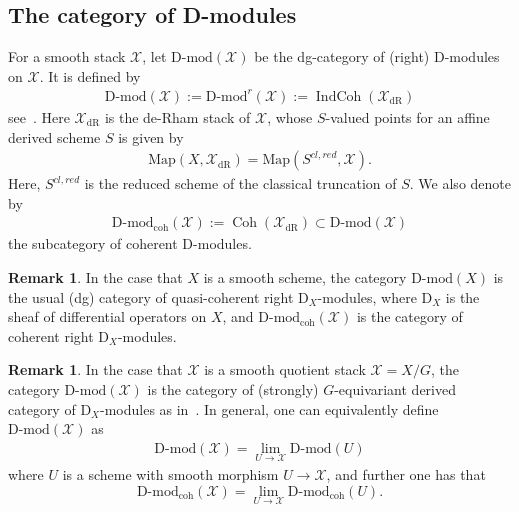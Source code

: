 \documentclass [11pt,oneside,a4paper,mathscr]{amsart}
\theoremstyle{definition}
\newtheorem{remark}[thm]{Remark}
\newcommand{\X}{\mathcal{X}}
\newcommand{\Coh}{\operatorname{Coh}}
\newcommand{\IndCoh}{\operatorname{IndCoh}}
\begin{document}
\subsection{The category of D-modules}\label{subsec:catD}
For a smooth stack $\mathcal{X}$, let $\text{D-mod}(\mathcal{X})$
be the dg-category of (right) D-modules on $\mathcal{X}$. 
It is defined by 
\begin{align*}
\text{D-mod}(\mathcal{X}):=
\text{D-mod}^r(\mathcal{X}):=\IndCoh(\mathcal{X}_{\mathrm{dR}})
\end{align*}
see~\cite{MR3701353}. 
Here $\mathcal{X}_{\mathrm{dR}}$ is the de-Rham stack of $\mathcal{X}$,
whose $S$-valued points for an affine derived scheme $S$ is 
given by 
\begin{align*}
\mathrm{Map}(X, \mathcal{X}_{\mathrm{dR}})=\mathrm{Map}(S^{cl, red}, \mathcal{X}). 
\end{align*}
Here, $S^{cl, red}$ is the reduced scheme of the classical truncation of $S$.
We also denote by 
\begin{align*}
    \text{D-mod}_{\mathrm{coh}}(\mathcal{X}):=\Coh(\X_{\mathrm{dR}}) \subset \text{D-mod}(\mathcal{X})
\end{align*}
the subcategory of coherent D-modules. 
\begin{remark}\label{rmk:D-mod1}
In the case that $X$ is a smooth scheme, 
the category $\text{D-mod}(X)$ is the usual (dg) category 
of quasi-coherent right $\mathrm{D}_{X}$-modules, where 
$\mathrm{D}_{X}$ is the sheaf of differential operators on $X$, and $\text{D-mod}_{\mathrm{coh}}(\mathcal{X})$ is the category of coherent right $\mathrm{D}_{X}$-modules.
\end{remark}
\begin{remark}\label{rmk:D-mod2}
In the case that $\mathcal{X}$ is a smooth quotient stack 
$\mathcal{X}=X/G$, the category $\text{D-mod}(\mathcal{X})$ is 
the category of (strongly) $G$-equivariant derived category of $\mathrm{D}_X$-modules 
as in~\cite[Section~5]{McNe}.  In general, one can equivalently 
define $\text{D-mod}(\mathcal{X})$ as 
\begin{align*}
    \text{D-mod}(\mathcal{X})=\lim_{U \to \mathcal{X}}\text{D-mod}(U)
\end{align*}
where $U$ is a scheme with smooth morphism $U\to \mathcal{X}$, and further one has that 
\[\text{D-mod}_{\mathrm{coh}}(\mathcal{X})=\lim_{U \to \mathcal{X}}\text{D-mod}_{\mathrm{coh}}(U).\]
\end{remark}
\end{document}
